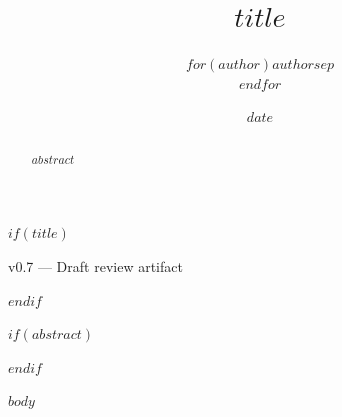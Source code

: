 \documentclass[11pt,a4paper]{article}
\title{\textbf{$title$}}
\author{$for(author)$$author$$sep$\\$endfor$}
\date{$date$}
\date{}
\begin{document}
$if(title)$
\maketitle
\thispagestyle{plain}
\begin{center}
\small v0.7 --- Draft review artifact
\end{center}
$endif$

$if(abstract)$
\begin{abstract}
$abstract$
\end{abstract}
$endif$

$body$
\end{document}
